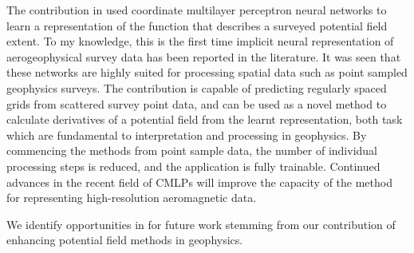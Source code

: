 The contribution in  used coordinate multilayer perceptron neural networks to learn a representation of the function that describes a surveyed potential field extent.
To my knowledge, this is the first time implicit neural representation of aerogeophysical survey data has been reported in the literature.
It was seen that these networks are highly suited for processing spatial data such as point sampled geophysics surveys.
The contribution is capable of predicting regularly spaced grids from scattered survey point data, and can be used as a novel method to calculate derivatives of a potential field from the learnt representation, both task which are fundamental to interpretation and processing in geophysics.
By commencing the methods from point sample data, the number of individual processing steps is reduced, and the application is fully trainable.
Continued advances in the recent field of CMLPs will improve the capacity of the method for representing high-resolution aeromagnetic data.

We identify opportunities in  for future work stemming from our contribution  of enhancing potential field methods in geophysics.

% 